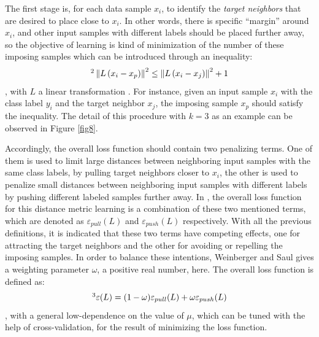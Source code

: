 The first stage is, for each data sample $x_i$, to identify the \textit{target neighbors} that are desired to place close to $x_i$. In other words, there is specific ``margin'' around $x_i$, and other input samples with different labels should be placed further away, so the objective of learning is kind of minimization of the number of these imposing samples which can be introduced through an inequality:
\begin{equation}\label{eq2}\footnotemark[2]
    \left\|L\left(x_{i}-x_{p}\right)\right\|^{2} \leq\left\|L\left(x_{i}-x_{j}\right)\right\|^{2}+1
\end{equation}
, with $L$ a linear transformation \cite{69}. For instance, given an input sample $x_i$ with the class label $y_{i}$ and the target neighbor $x_{j}$, the imposing sample $x_{p}$ should satisfy the inequality. The detail of this procedure with $k=3$ as an example can be observed in Figure \ref{fig8}.

Accordingly, the overall loss function should contain two penalizing terms. One of them is used to limit large distances between neighboring input samples with the same class labels, by pulling target neighbors closer to $x_i$, the other is used to penalize small distances between neighboring input samples with different labels by pushing different labeled samples further away. In \cite{69}, the overall loss function for this distance metric learning is a combination of these two mentioned terms, which are denoted as $\varepsilon_{pull}(L)$ and $\varepsilon_{push}(L)$ respectively. With all the previous definitions, it is indicated that these two terms have competing effects, one for attracting the target neighbors and the other for avoiding or repelling the imposing samples. In order to balance these intentions, Weinberger and Saul gives a weighting parameter $\omega$, a positive real number, here. The overall loss function is defined as:
\begin{equation}\label{eq3}\footnotemark[3]
    \varepsilon(L)=(1-\omega) \varepsilon_{p u l l}(L)+\omega \varepsilon_{p u s h}(L)
\end{equation}
, with a general low-dependence on the value of $\mu$, which can be tuned with the help of cross-validation, for the result of minimizing the loss function.

